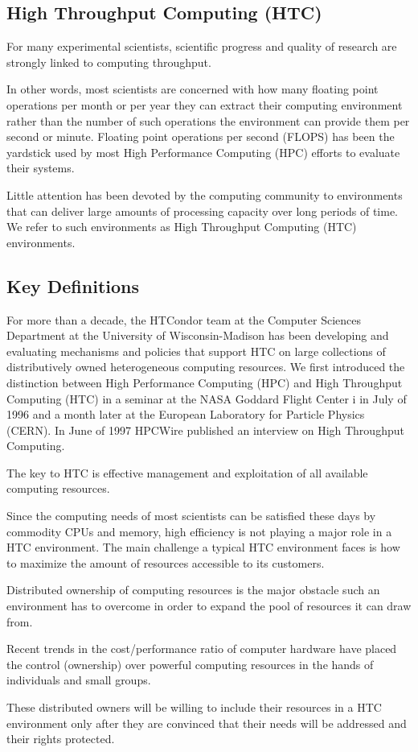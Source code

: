 \subsection*{High Throughput Computing (HTC)}
For many experimental scientists, scientific progress and quality of research are strongly linked to computing throughput. 

In other words, most scientists are concerned with how many floating point operations per month or per year they can extract 
their computing environment rather than the number of such operations the environment can provide them per second or minute. 
Floating point operations per second (FLOPS) has been the yardstick used by most High Performance Computing (HPC) efforts to 
evaluate their systems. 

Little attention has been devoted by the computing community to environments that can deliver large 
amounts of processing capacity over long periods of time. We refer to such environments as High Throughput Computing (HTC) 
environments.

\subsection{Key Definitions}
For more than a decade, the HTCondor team at the Computer Sciences Department at the University of Wisconsin-Madison has been 
developing and evaluating mechanisms and policies that support HTC on large collections of distributively owned heterogeneous 
computing resources. We first introduced the distinction between High Performance Computing (HPC) and High Throughput Computing 
(HTC) in a seminar at the NASA Goddard Flight Center i in July of 1996 and a month later at the European Laboratory for 
Particle Physics (CERN). In June of 1997 HPCWire published an interview on High Throughput Computing.

The key to HTC is effective management and exploitation of all available computing resources. 

Since the computing needs of most scientists can be satisfied these days by commodity CPUs and memory, high efficiency is 
not playing a major role in a HTC environment. The main challenge a typical HTC environment faces is how to maximize the 
amount of resources accessible to its customers. 

Distributed ownership of computing resources is the major obstacle such 
an environment has to overcome in order to expand the pool of resources it can draw from. 

Recent trends in the cost/performance  ratio of computer hardware have placed the control (ownership) over powerful 
computing resources in the hands of individuals and small groups. 

These distributed owners will be willing to include their resources in a HTC
environment only after they are convinced that their needs will be addressed and their rights protected.
